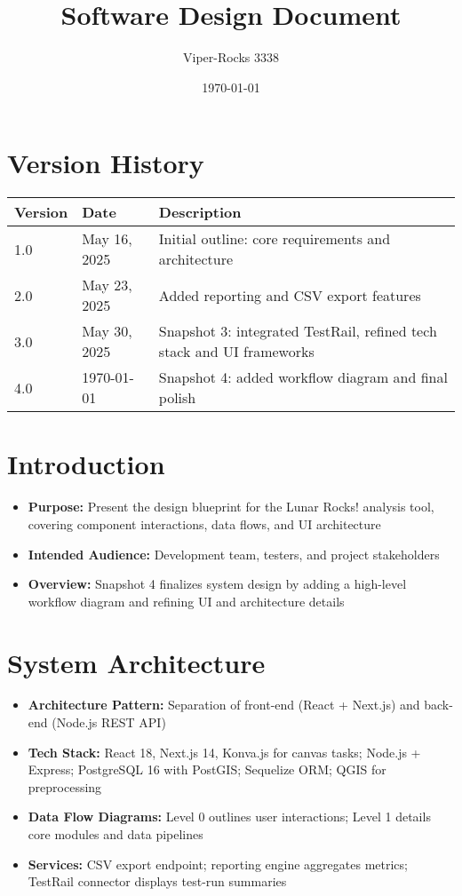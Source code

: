 \documentclass{article}
\title{Software Design Document}
\author{Viper-Rocks 3338}
\date{\today}
\begin{document}
\maketitle

\tableofcontents
\newpage

\section*{Version History}
\begin{tabular}{|l|l|p{8cm}|}
\hline
\textbf{Version} & \textbf{Date}       & \textbf{Description} \\\hline
1.0   & May 16, 2025          & Initial outline: core requirements and architecture \\\hline
2.0   & May 23, 2025          & Added reporting and CSV export features \\\hline
3.0   & May 30, 2025          & Snapshot 3: integrated TestRail, refined tech stack and UI frameworks \\\hline
4.0   & \today                & Snapshot 4: added workflow diagram and final polish \\\hline
\end{tabular}

\section{Introduction}
\begin{itemize}
  \item \textbf{Purpose:} Present the design blueprint for the Lunar Rocks! analysis tool, covering component interactions, data flows, and UI architecture
  \item \textbf{Intended Audience:} Development team, testers, and project stakeholders
  \item \textbf{Overview:} Snapshot 4 finalizes system design by adding a high-level workflow diagram and refining UI and architecture details
\end{itemize}

\section{System Architecture}
\begin{itemize}
  \item \textbf{Architecture Pattern:} Separation of front-end (React + Next.js) and back-end (Node.js REST API)
  \item \textbf{Tech Stack:} React 18, Next.js 14, Konva.js for canvas tasks; Node.js + Express; PostgreSQL 16 with PostGIS; Sequelize ORM; QGIS for preprocessing
  \item \textbf{Data Flow Diagrams:} Level 0 outlines user interactions; Level 1 details core modules and data pipelines
  \item \textbf{Services:} CSV export endpoint; reporting engine aggregates metrics; TestRail connector displays test-run summaries
\end{itemize}
\end{document}
